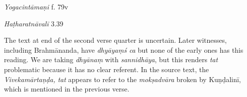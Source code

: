 \begin{ekdosis}
\begin{sources}[hp01_048]
\end{sources}

\begin{testimonia}[hp01_048]
\emph{Yogacintāmaṇi} f. 79v

\begin{versinnote}
\end{versinnote}

\emph{Haṭharatnāvalī} 3.39

\begin{versinnote}
\tl{\var{proccārayet ] proccālayat P,T,t1,n2}\\!}
\end{versinnote}

\end{testimonia}

\begin{philcomm}[hp01_048]

The text at end of the second verse quarter is uncertain. Later witnesses, including Brahmānanda, have \emph{dhyāyaṃś ca} but none of the early ones has this reading. We are taking \emph{dhyānaṃ} with \emph{sannidhāya}, but this renders \emph{tat} problematic because it has no clear referent. In the source text, the \emph{Vivekamārtaṇḍa, tat} appears to refer to the \emph{mokṣadvāra} broken by Kuṇḍalinī, which is mentioned in the previous verse. 


\end{philcomm}
\end{ekdosis}
